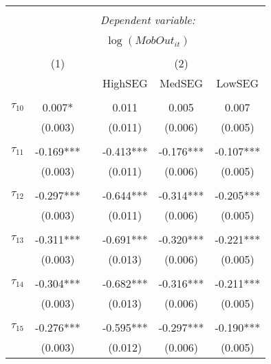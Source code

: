 \begin{tabular}{@{\extracolsep{-5pt}}lccccc} 
\\[-1.8ex]\hline 
\hline \\[-1.8ex] 
 & \multicolumn{5}{c}{\textit{Dependent variable:}} \\ 
\cline{2-6} 
\\[-1.8ex] & \multicolumn{5}{c}{$\log(MobOut_{it})$}\\ 
\\[-1.8ex] & (1) && \multicolumn{3}{c}{(2)} \\ 
\cline{2-2}\cline{4-6}
        &&& HighSEG & MedSEG & LowSEG  \\
 \\[-1.8ex] 
$\tau_{10}$     &  0.007*   &&   0.011   &   0.005   &   0.007   \\
                &  (0.003)  &&  (0.011)  &  (0.006)  &  (0.005)  \\
                &           &&           &           &           \\[-2.1ex]
$\tau_{11}$     & -0.169*** && -0.413*** & -0.176*** & -0.107*** \\
                &  (0.003)  &&  (0.011)  &  (0.006)  &  (0.005)  \\
                &           &&           &           &           \\[-2.1ex]
$\tau_{12}$     & -0.297*** && -0.644*** & -0.314*** & -0.205*** \\
                &  (0.003)  &&  (0.011)  &  (0.006)  &  (0.005)  \\
                &           &&           &           &           \\[-2.1ex]
$\tau_{13}$     & -0.311*** && -0.691*** & -0.320*** & -0.221*** \\
                &  (0.003)  &&  (0.013)  &  (0.006)  &  (0.005)  \\
                &           &&           &           &           \\[-2.1ex]
$\tau_{14}$     & -0.304*** && -0.682*** & -0.316*** & -0.211*** \\
                &  (0.003)  &&  (0.013)  &  (0.006)  &  (0.005)  \\
                &           &&           &           &           \\[-2.1ex]
$\tau_{15}$     & -0.276*** && -0.595*** & -0.297*** & -0.190*** \\
                &  (0.003)  &&  (0.012)  &  (0.006)  &  (0.005)  \\

\end{tabular}

